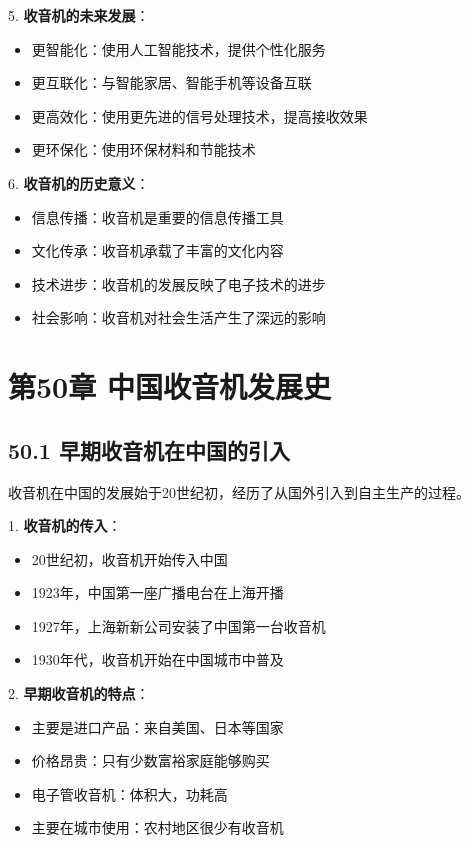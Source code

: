 \documentclass[12pt,UTF8]{ctexbook}
\begin{document}
5. \textbf{收音机的未来发展}：
   \begin{itemize}[leftmargin=3.5em]
   \item 更智能化：使用人工智能技术，提供个性化服务
   \item 更互联化：与智能家居、智能手机等设备互联
   \item 更高效化：使用更先进的信号处理技术，提高接收效果
   \item 更环保化：使用环保材料和节能技术
   \end{itemize}

6. \textbf{收音机的历史意义}：
   \begin{itemize}[leftmargin=3.5em]
   \item 信息传播：收音机是重要的信息传播工具
   \item 文化传承：收音机承载了丰富的文化内容
   \item 技术进步：收音机的发展反映了电子技术的进步
   \item 社会影响：收音机对社会生活产生了深远的影响
   \end{itemize}

\chapter*{第50章 中国收音机发展史}
\section*{50.1 早期收音机在中国的引入}

收音机在中国的发展始于20世纪初，经历了从国外引入到自主生产的过程。

1. \textbf{收音机的传入}：
   \begin{itemize}[leftmargin=3.5em]
   \item 20世纪初，收音机开始传入中国
   \item 1923年，中国第一座广播电台在上海开播
   \item 1927年，上海新新公司安装了中国第一台收音机
   \item 1930年代，收音机开始在中国城市中普及
   \end{itemize}

2. \textbf{早期收音机的特点}：
   \begin{itemize}[leftmargin=3.5em]
   \item 主要是进口产品：来自美国、日本等国家
   \item 价格昂贵：只有少数富裕家庭能够购买
   \item 电子管收音机：体积大，功耗高
   \item 主要在城市使用：农村地区很少有收音机
   \end{itemize}
\end{document}
